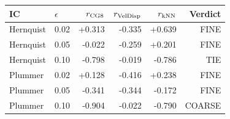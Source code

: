 \begin{tabular}{llrrrr}
\toprule
IC & $\epsilon$ & $r_{\rm CG8}$ & $r_{\rm VelDisp}$ & $r_{\rm kNN}$ & Verdict\\
\midrule
Hernquist & 0.02 & +0.313 & -0.335 & +0.639 & FINE\\
Hernquist & 0.05 & -0.022 & -0.259 & +0.201 & FINE\\
Hernquist & 0.10 & -0.798 & -0.019 & -0.786 & TIE\\
\midrule
Plummer & 0.02 & +0.128 & -0.416 & +0.238 & FINE\\
Plummer & 0.05 & -0.341 & -0.344 & -0.172 & FINE\\
Plummer & 0.10 & -0.904 & -0.022 & -0.790 & COARSE\\
\midrule
\bottomrule
\end{tabular}
